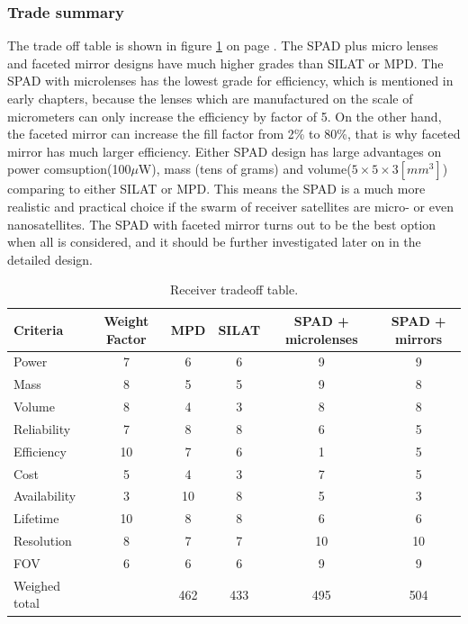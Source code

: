 \subsubsection{Trade summary}
\label{TOReceiverS}
The trade off table is shown in figure \ref{table:receiverTradeTable} on page \pageref{table:receiverTradeTable}. The \acs{SPAD} plus micro lenses and faceted mirror designs have much higher grades than \acs{SILAT} or \acs{MPD}. The \acs{SPAD} with microlenses has the lowest grade for efficiency, which is mentioned in early chapters, because the lenses which are manufactured on the scale of micrometers can only increase the efficiency by factor of 5. On the other hand, the faceted mirror can increase the fill factor from 2\% to 80\%, that is why faceted mirror has much larger efficiency. Either \acs{SPAD} design has large advantages on power comsuption(100$\mu$W), mass (tens of grams) and volume($5\times5\times3[mm^{3}]$) comparing to either \acs{SILAT} or \acs{MPD}. This means the \ac{SPAD} is a much more realistic and practical choice if the swarm of receiver satellites are micro- or even nanosatellites. The \acs{SPAD} with faceted mirror turns out to be the best option when all is considered, and it should be further investigated later on in the detailed design.

\begin{table}[h]
	\centering
		\begin{tabular}{l|c|c|c|c|c}
		 \textbf{Criteria} & \textbf{Weight Factor} & \textbf{MPD} & \textbf{SILAT} & \textbf{SPAD + microlenses} & \textbf{SPAD + mirrors} \\ \hline \hline
		 Power & 7 & 6 & 6 & 9 & 9 \\ 
		 Mass & 8 & 5 & 5 & 9 & 8 \\
		 Volume & 8 & 4 & 3 & 8 & 8 \\
		 Reliability & 7 & 8 & 8 & 6 & 5 \\
		 Efficiency & 10 & 7 & 6 & 1 & 5 \\
		 Cost & 5 & 4 & 3 & 7 & 5 \\
		 Availability & 3 & 10 & 8 & 5 & 3 \\
		 Lifetime & 10 & 8 & 8 & 6 & 6 \\
		 Resolution & 8 & 7 & 7 & 10 & 10 \\
		 FOV & 6 & 6 & 6 & 9 & 9 \\ \hline
		 Weighed total &   & 462 & 433 & 495 & 504 \\
			
		\end{tabular}
	\caption{Receiver tradeoff table.}
	\label{table:receiverTradeTable}
\end{table}

